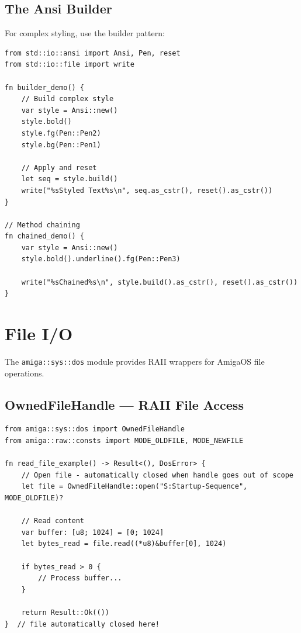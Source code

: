 \subsection{The Ansi Builder}

For complex styling, use the builder pattern:

\begin{lstlisting}
from std::io::ansi import Ansi, Pen, reset
from std::io::file import write

fn builder_demo() {
    // Build complex style
    var style = Ansi::new()
    style.bold()
    style.fg(Pen::Pen2)
    style.bg(Pen::Pen1)

    // Apply and reset
    let seq = style.build()
    write("%sStyled Text%s\n", seq.as_cstr(), reset().as_cstr())
}

// Method chaining
fn chained_demo() {
    var style = Ansi::new()
    style.bold().underline().fg(Pen::Pen3)

    write("%sChained%s\n", style.build().as_cstr(), reset().as_cstr())
}
\end{lstlisting}

\section{File I/O}
\label{sec:file-io}

The \texttt{amiga::sys::dos} module provides RAII wrappers for AmigaOS file operations.

\subsection{OwnedFileHandle --- RAII File Access}

\begin{lstlisting}
from amiga::sys::dos import OwnedFileHandle
from amiga::raw::consts import MODE_OLDFILE, MODE_NEWFILE

fn read_file_example() -> Result<(), DosError> {
    // Open file - automatically closed when handle goes out of scope
    let file = OwnedFileHandle::open("S:Startup-Sequence", MODE_OLDFILE)?

    // Read content
    var buffer: [u8; 1024] = [0; 1024]
    let bytes_read = file.read((*u8)&buffer[0], 1024)

    if bytes_read > 0 {
        // Process buffer...
    }

    return Result::Ok(())
}  // file automatically closed here!
\end{lstlisting}

